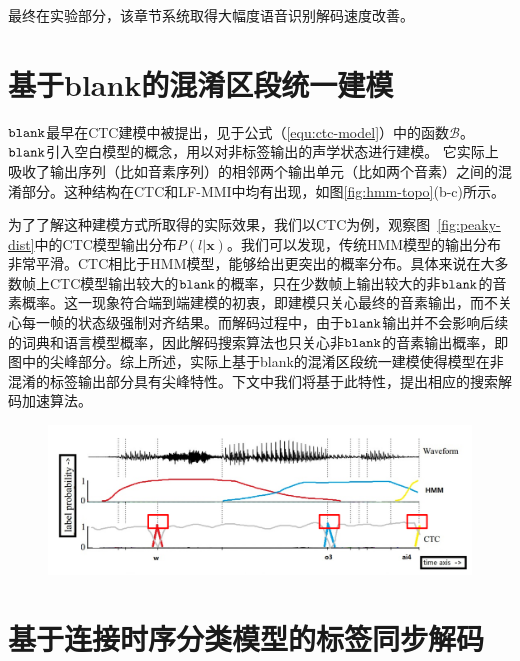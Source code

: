 最终在实验部分，该章节系统取得大幅度语音识别解码速度改善。


\section{基于blank的混淆区段统一建模}
\label{chap:lsd-blank}

$\tt blank$最早在CTC建模中被提出，见于公式（\ref{equ:ctc-model}）中的函数$\mathcal{B}$。$\tt blank$引入空白模型的概念，用以对非标签输出的声学状态进行建模。
它实际上吸收了输出序列（比如音素序列）的相邻两个输出单元（比如两个音素）之间的混淆部分。这种结构在CTC和LF-MMI中均有出现，如图\ref{fig:hmm-topo}(b-c)所示。

为了了解这种建模方式所取得的实际效果，我们以CTC为例，观察图~\ref{fig:peaky-dist}中的CTC模型输出分布$P(l|\mathbf{x})$。我们可以发现，传统HMM模型的输出分布非常平滑。CTC相比于HMM模型，能够给出更突出的概率分布。具体来说在大多数帧上CTC模型输出较大的$\tt blank$的概率，只在少数帧上输出较大的非$\tt blank$的音素概率。这一现象符合端到端建模的初衷，即建模只关心最终的音素输出，而不关心每一帧的状态级强制对齐结果。而解码过程中，由于$\tt blank$输出并不会影响后续的词典和语言模型概率，因此解码搜索算法也只关心非$\tt blank$的音素输出概率，即图中的尖峰部分。综上所述，实际上基于blank的混淆区段统一建模使得模型在非混淆的标签输出部分具有尖峰特性。下文中我们将基于此特性，提出相应的搜索解码加速算法。


\begin{figure}[!htp]
  \centering
    \captionstyle{\centering}
    \includegraphics[width=\textwidth]{figure/peaky_distribution.png}
\end{figure}


\section{基于连接时序分类模型的标签同步解码}
\label{chap:lsd-ctc}


